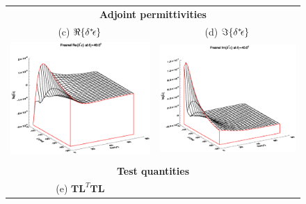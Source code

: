 \begin{figure}[htp]
\begin{tabular}{c c}
    \multicolumn{2}{c}{\sffamily\textbf{Adjoint permittivities}}\\
    \textsf{(c)} $\Re\{\delta^{*}\! \epsilon\}$ &
    \textsf{(d)} $\Im\{\delta^{*}\! \epsilon\}$ \\
    \includegraphics[bb=115 240 508 540,clip,scale=0.5]{graphics/Fresnel/TLAD/Re_e_AD_z40.0.eps} &
    \includegraphics[bb=115 240 508 540,clip,scale=0.5]{graphics/Fresnel/TLAD/Im_e_AD_z40.0.eps} \\\\
    \multicolumn{2}{c}{\sffamily\textbf{Test quantities}}\\
    \textsf{(e)} $\mathbf{TL}^{T}\mathbf{TL}$ &

\end{tabular}
\end{figure}
